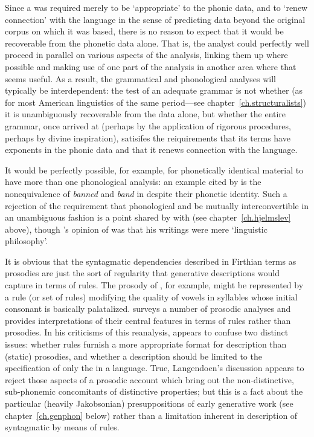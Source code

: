 Since a  was required merely to be `appropriate' to
the phonic data, and to `renew connection' with the language in the
sense of predicting data beyond the original corpus on which it was
based, there is no reason to expect that it would be recoverable from
the phonetic data alone. That is, the analyst could perfectly well
proceed in parallel on various aspects of the analysis, linking them
up where possible and making use of one part of the analysis in
another area where that seems useful. As a result, the grammatical and
phonological analyses will typically be interdependent: the test of an
adequate grammar is not whether (as for most American linguistics of
the same period—see chapter~\ref{ch.structuralists}) it is
unambiguously recoverable from the data alone, but whether the entire
grammar, once arrived at (perhaps by the application of rigorous
procedures, perhaps by divine inspiration), satisifes the
reiquirements that its terms have exponents in the phonic data and
that it renews connection with the language.

It would be perfectly possible, for example, for phonetically
identical material to have more than one phonological analysis: an
example cited by \citet{palmer70:prosodic} is the nonequivalence of
\emph{banned} and \emph{band} in  despite their phonetic
identity. Such a rejection of the requirement that phonological and
 be mutually interconvertible in an
unambiguous fashion is a point shared by {\Firth} with {\Hjelmslev} (see
chapter~\ref{ch.hjelmslev} above), though {\Firth}'s opinion of {\Hjelmslev}
was that his writings were mere `linguistic philosophy'.

It is obvious that the syntagmatic dependencies described in Firthian
terms as prosodies are just the sort of regularity that generative
descriptions would capture in terms of rules. The prosody of
, for example, might be represented by a rule (or set of
rules) modifying the quality of vowels in syllables whose initial
consonant is basically palatalized. \citet{langendoen68:london.school}
surveys a number of prosodic analyses and provides interpretations of
their central features in terms of rules rather than prosodies. In his
criticisms of this reanalysis, \citet{robins69:rvw.langendoen} appears
to confuse two distinct issues: whether rules furnish a more
appropriate format for description than (static) prosodies, and
whether a description should be limited to the specification of only
the  in a language. True, Langendoen's discussion
appears to reject those aspects of a prosodic account which bring out
the non-distinctive, sub-phonemic concomitants of distinctive
properties; but this is a fact about the particular (heavily
Jakobsonian) presuppositions of early generative work (see
chapter~\ref{ch.genphon} below) rather than a limitation inherent in
description of syntagmatic  by means of rules.


